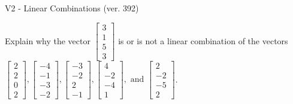 \begin{exercise}
  \begin{exerciseTitle}V2 - Linear Combinations (ver. 392)\end{exerciseTitle}
  \begin{exerciseStatement}
    Explain why the vector \(\left[\begin{array}{c}
3 \\
1 \\
5 \\
3
\end{array}\right]\)  is or is not a linear 
	combination of the vectors \(\left[\begin{array}{c}
2 \\
2 \\
0 \\
2
\end{array}\right] , \left[\begin{array}{c}
-4 \\
-1 \\
-3 \\
-2
\end{array}\right] , \left[\begin{array}{c}
-3 \\
-2 \\
2 \\
-1
\end{array}\right] , \left[\begin{array}{c}
4 \\
-2 \\
-4 \\
1
\end{array}\right] , \text{ and } \left[\begin{array}{c}
2 \\
-2 \\
-5 \\
2
\end{array}\right]\).
	



\end{exerciseStatement}
\end{exercise}
